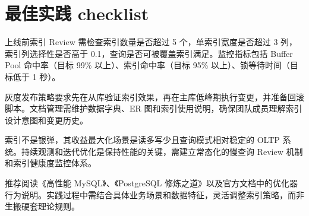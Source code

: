 \chapter{最佳实践 checklist}
上线前索引 Review 需检查索引数量是否超过 5 个，单索引宽度是否超过 3 列，索引列选择性是否高于 0.1，查询是否可被覆盖索引满足。监控指标包括 Buffer Pool 命中率（目标 99\%{} 以上）、索引命中率（目标 95\%{} 以上）、锁等待时间（目标低于 1 秒）。\par
灰度发布策略要求先在从库验证索引效果，再在主库低峰期执行变更，并准备回滚脚本。文档管理需维护数据字典、ER 图和索引使用说明，确保团队成员理解索引设计意图和变更历史。\par
索引不是银弹，其收益最大化场景是读多写少且查询模式相对稳定的 OLTP 系统。持续观测和迭代优化是保持性能的关键，需建立常态化的慢查询 Review 机制和索引健康度监控体系。\par
推荐阅读《高性能 MySQL》、《PostgreSQL 修炼之道》以及官方文档中的优化器行为说明。实践过程中需结合具体业务场景和数据特征，灵活调整索引策略，而非生搬硬套理论规则。\par
